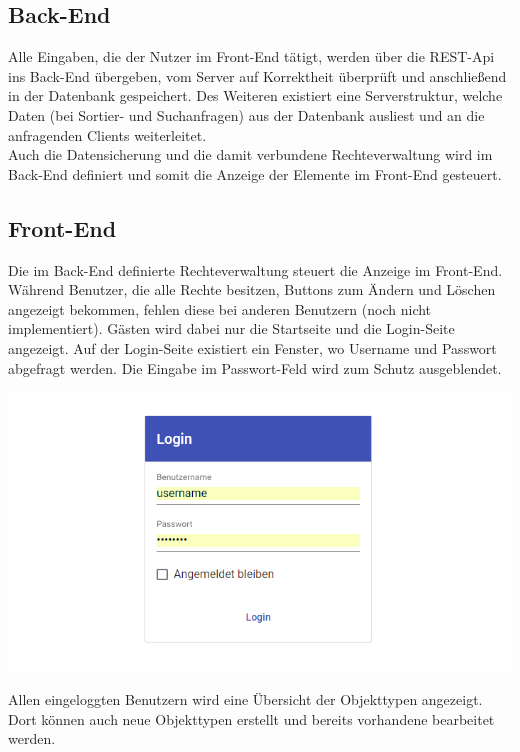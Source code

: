 \documentclass[11pt,a4paper]{report}
\begin{document}
	\subsection{Back-End}
	Alle Eingaben, die der Nutzer im Front-End tätigt, werden über die REST-Api ins Back-End übergeben, vom Server auf Korrektheit überprüft und anschließend in der Datenbank gespeichert. Des Weiteren existiert eine Serverstruktur, welche Daten (bei Sortier- und Suchanfragen) aus der Datenbank ausliest und an die anfragenden Clients weiterleitet.\\
	Auch die Datensicherung und die damit verbundene Rechteverwaltung wird im Back-End definiert und somit die Anzeige der Elemente im Front-End gesteuert.
	
	\newpage	
	
	\subsection{Front-End}
	Die im Back-End definierte Rechteverwaltung steuert die Anzeige im Front-End. Während Benutzer, die alle Rechte besitzen, Buttons zum Ändern und Löschen angezeigt bekommen, fehlen diese bei anderen Benutzern (noch nicht implementiert). 
	Gästen wird dabei nur die Startseite und die Login-Seite angezeigt. 
	Auf der Login-Seite existiert ein Fenster, wo Username und Passwort abgefragt werden. 
	Die Eingabe im Passwort-Feld wird zum Schutz ausgeblendet.
	
	\begin{center}
		\includegraphics[scale=0.5]{login.png}\\
	\end{center}
	
	Allen eingeloggten Benutzern wird eine Übersicht der Objekttypen angezeigt. 
	Dort können auch neue Objekttypen erstellt und bereits vorhandene bearbeitet werden.\\ 
	
\end{document}
